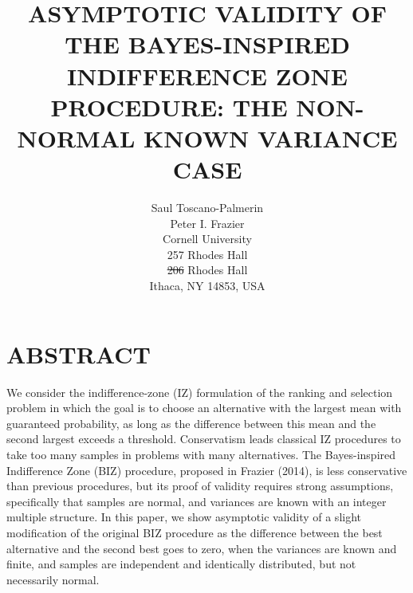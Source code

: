 \documentclass{wscpaperproc}
\theoremstyle{wsc}
\providecommand{\DIFaddtex}[1]{{\protect\color{blue}\uwave{#1}}} %
\providecommand{\DIFdeltex}[1]{{\protect\color{red}\sout{#1}}}                      %
\providecommand{\DIFaddbegin}{} %
\providecommand{\DIFaddend}{} %
\providecommand{\DIFdelbegin}{} %
\providecommand{\DIFdelend}{} %
\providecommand{\DIFadd}[1]{\texorpdfstring{\DIFaddtex{#1}}{#1}} %
\providecommand{\DIFdel}[1]{\texorpdfstring{\DIFdeltex{#1}}{}} %
\begin{document}
%
%

\title{ASYMPTOTIC VALIDITY OF THE BAYES-INSPIRED INDIFFERENCE ZONE PROCEDURE: 
THE NON-NORMAL KNOWN VARIANCE CASE}




\author{
	Saul Toscano-Palmerin\\ 
    	Peter I. Frazier\\[12pt]
	Cornell University \\
	257 Rhodes Hall \\
	\DIFdelbegin \DIFdel{206 }\DIFdelend \DIFaddbegin \DIFadd{232 }\DIFaddend Rhodes Hall \\
	Ithaca, NY 14853, USA\\
}





\maketitle



\section*{ABSTRACT}
We consider the indifference-zone (IZ) formulation of the ranking and selection problem in which the goal is to choose an alternative with the largest mean with guaranteed probability, as long as the difference between this mean and the second largest exceeds a threshold.
Conservatism leads classical IZ procedures to take too many samples in problems with many alternatives. The Bayes-inspired
Indifference Zone (BIZ) procedure, proposed in Frazier (2014), is
less conservative than previous procedures, but its proof of validity
requires strong assumptions, specifically that samples are normal, and variances are known 
with an integer multiple structure. In this paper, 
we show asymptotic validity of a slight modification of the original BIZ procedure 
as the difference between the best alternative and the second best goes to zero,
when the variances are known and finite, and samples are independent and identically distributed, but not necessarily normal.
\end{document}
